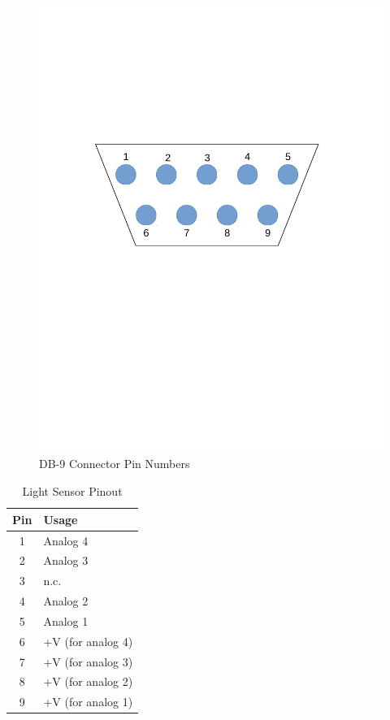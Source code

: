 \documentclass[10pt, openany]{book}
\begin{document}
\begin{figure}[htb]
  \begin{center}
    \includegraphics[scale=0.25]{D9Pins.pdf}
    \caption{DB-9 Connector Pin Numbers}
    \label{fig:D9}
  \end{center}
\end{figure}

\begin{table}
  \begin{center}
    \caption{Light Sensor Pinout}
    \label{tbl:Sensor}
    \begin{tabular}[htb]{|c|l|}
      \hline
      Pin & Usage \\
      \hline
      1 & Analog 4 \\
      2 & Analog 3 \\
      3 & n.c. \\
      4 & Analog 2 \\
      5 & Analog 1 \\
      6 & +V (for analog 4)\\
      7 & +V (for analog 3)\\
      8 & +V (for analog 2)\\
      9 & +V (for analog 1)\\
      \hline
    \end{tabular}
  \end{center}
\end{table}
\end{document}
